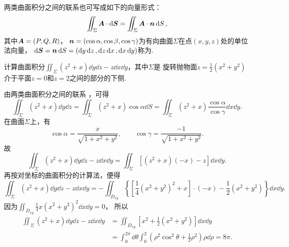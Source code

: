 两类曲面积分之间的联系也可写成如下的向量形式：
\begin{equation}\label{equation:线积分与面积分.两类曲面积分之间的联系的向量形式}
	\iint_\Sigma \boldsymbol{A} \cdot \dd{\boldsymbol{S}}
	=\iint_\Sigma \boldsymbol{A} \cdot \boldsymbol{n} \dd{S},
\end{equation}
其中\(\boldsymbol{A}=(P,Q,R)\)，
\(\boldsymbol{n}=(\cos\alpha,\cos\beta,\cos\gamma)\)为有向曲面\(\Sigma\)在点\((x,y,z)\)处的单位法向量，
\(\dd{\boldsymbol{S}}
= \boldsymbol{n}\dd{S}
= (\dd{y}\dd{z},\dd{z}\dd{x},\dd{x}\dd{y})\)称为.

\begin{example}
\def\ys{\iint_\Sigma (z^2+x) \dd{y}\dd{z} - z \dd{x}\dd{y}}%
计算曲面积分\(\ys\)，其中\(\Sigma\)是
旋转抛物面\(z = \frac{1}{2}(x^2+y^2)\)介于平面\(z=0\)和\(z=2\)之间的部分的下侧.
\begin{solution}
由两类曲面积分之间的联系 ，可得\[
	\iint_\Sigma (z^2+x) \dd{y}\dd{z}
	= \iint_\Sigma (z^2+x) \cos\alpha \dd{S}
	= \iint_\Sigma (z^2+x) \frac{\cos\alpha}{\cos\gamma} \dd{x}\dd{y}.
\]
在曲面\(\Sigma\)上，有\[
	\cos\alpha
	= \frac{x}{\sqrt{1+x^2+y^2}},
	\qquad
	\cos\gamma
	= \frac{-1}{\sqrt{1+x^2+y^2}}.
\]
故\[
	\ys
	= \iint_\Sigma [(z^2+x)(-x) - z] \dd{x}\dd{y}.
\]
再按对坐标的曲面积分的计算法，便得\[
	\ys
	= - \iint_{D_{xy}} \left\{
		\left[
			\frac{1}{4} (x^2+y^2)^2
			+ x
		\right] \cdot (-x)
		- \frac{1}{2} (x^2+y^2)
	\right\} \dd{x}\dd{y}.
\]
因为\(\iint_{D_{xy}} \frac{1}{4} x(x^2+y^2)^2 \dd{x}\dd{y} = 0\)，
所以\begin{align*}
	\ys
	&= \iint_{D_{xy}} \left[x^2+\frac{1}{2}(x^2+y^2)\right] \dd{x}\dd{y} \\
	&= \int_0^{2\pi} \dd{\theta}
		\int_0^2 \left(\rho^2 \cos^2\theta + \frac{1}{2} \rho^2\right) \rho \dd{\rho}
	= 8\pi.
\end{align*}
\end{solution}
\end{example}
